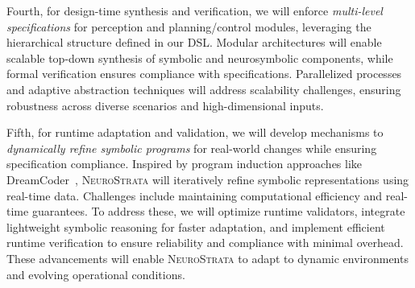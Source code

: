 Fourth, for design-time synthesis and verification, we will enforce \textit{multi-level specifications} for perception and planning/control modules, leveraging the hierarchical structure  defined in our DSL. Modular architectures will enable scalable top-down synthesis of symbolic and neurosymbolic components, while formal verification ensures compliance with specifications. Parallelized processes and adaptive abstraction techniques will address scalability challenges, ensuring robustness across diverse scenarios and high-dimensional inputs.

Fifth, for runtime adaptation and validation, we will develop mechanisms to \textit{dynamically refine symbolic programs} for real-world changes while ensuring specification compliance. Inspired by program induction approaches like DreamCoder~\cite{ellis2021dreamcoder}, \textsc{NeuroStrata} will iteratively refine symbolic representations using real-time data. Challenges include maintaining computational efficiency and real-time guarantees. To address these, we will optimize runtime validators, integrate lightweight symbolic reasoning for faster adaptation, and implement efficient runtime verification to ensure reliability and compliance with minimal overhead. These advancements will enable \textsc{NeuroStrata} to adapt to dynamic environments and evolving operational conditions.



